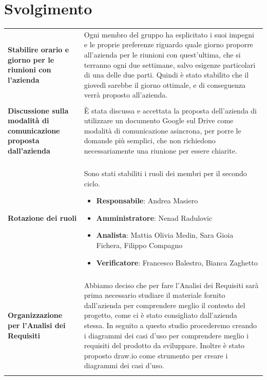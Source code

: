 \documentclass[a4paper,12pt]{article}
\begin{document}
    \section{Svolgimento} {
        \begin{longtable}{P{5cm}|P{10cm}} 
            \textbf{Stabilire orario e giorno per le riunioni con l'azienda} & Ogni membro del gruppo ha esplicitato i suoi impegni e le proprie preferenze riguardo quale giorno proporre all'azienda per le riunioni con quest'ultima, che si terranno ogni due settimane, salvo esigenze particolari di una delle due parti. Quindi è stato stabilito che il giovedì sarebbe il giorno ottimale, e di conseguenza verrà proposto all'azienda. \\\\
            \textbf{Discussione sulla modalità di comunicazione proposta dall'azienda} & È stata discussa e accettata la proposta dell'azienda di utilizzare un documento Google sul Drive come modalità di comunicazione asincrona, per porre le domande più semplici, che non richiedono necessariamente una riunione per essere chiarite.\\\\
            \textbf{Rotazione dei ruoli} & Sono stati stabiliti i ruoli dei membri per il secondo ciclo.
            \begin{itemize}
                \item \textbf{Responsabile}: Andrea Masiero
                \item \textbf{Amministratore}: Nenad Radulovic
                \item \textbf{Analista}: Mattia Olivia Medin, Sara Gioia Fichera, Filippo Compagno
                \item \textbf{Verificatore}: Francesco Balestro, Bianca Zaghetto
            \end{itemize}\\\\
            \textbf{Organizzazione per l'Analisi dei Requisiti} & Abbiamo deciso che per fare l'Analisi dei Requisiti sarà prima necessario studiare il materiale fornito dall'azienda per comprendere meglio il contesto del progetto, come ci è stato consigliato dall'azienda stessa. In seguito a questo studio procederemo creando i diagrammi dei casi d'uso per comprendere meglio i requisiti del prodotto da sviluppare. Inoltre è stato proposto draw.io come strumento per creare i diagrammi dei casi d'uso.\\\\
        \end{longtable}
    }
\end{document}
